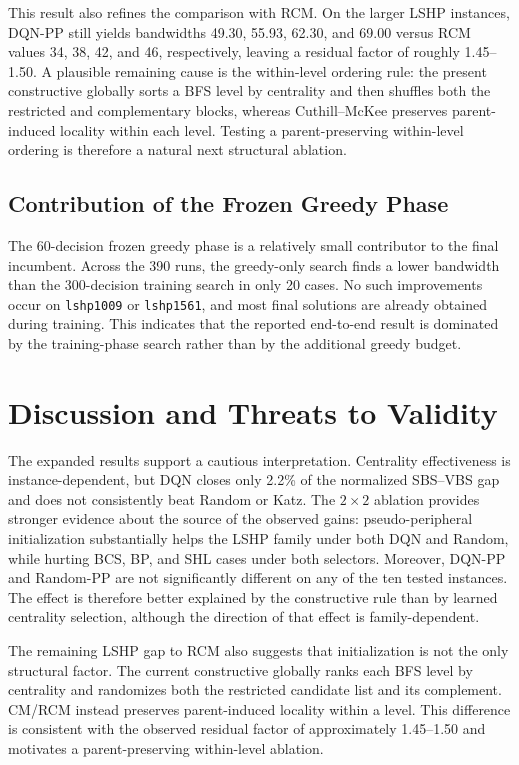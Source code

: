 \documentclass[runningheads]{llncs}
\begin{document}
This result also refines the comparison with RCM. On the larger LSHP instances, DQN-PP still yields bandwidths 49.30, 55.93, 62.30, and 69.00 versus RCM values 34, 38, 42, and 46, respectively, leaving a residual factor of roughly 1.45--1.50. A plausible remaining cause is the within-level ordering rule: the present constructive globally sorts a BFS level by centrality and then shuffles both the restricted and complementary blocks, whereas Cuthill--McKee preserves parent-induced locality within each level. Testing a parent-preserving within-level ordering is therefore a natural next structural ablation.


\subsection{Contribution of the Frozen Greedy Phase}

The 60-decision frozen greedy phase is a relatively small contributor to the final incumbent. Across the 390 runs, the greedy-only search finds a lower bandwidth than the 300-decision training search in only 20 cases. No such improvements occur on \texttt{lshp1009} or \texttt{lshp1561}, and most final solutions are already obtained during training. This indicates that the reported end-to-end result is dominated by the training-phase search rather than by the additional greedy budget.


\section{Discussion and Threats to Validity}

The expanded results support a cautious interpretation. Centrality effectiveness is instance-dependent, but DQN closes only 2.2\% of the normalized SBS--VBS gap and does not consistently beat Random or Katz. The $2\times2$ ablation provides stronger evidence about the source of the observed gains: pseudo-peripheral initialization substantially helps the LSHP family under both DQN and Random, while hurting BCS, BP, and SHL cases under both selectors. Moreover, DQN-PP and Random-PP are not significantly different on any of the ten tested instances. The effect is therefore better explained by the constructive rule than by learned centrality selection, although the direction of that effect is family-dependent.

The remaining LSHP gap to RCM also suggests that initialization is not the only structural factor. The current constructive globally ranks each BFS level by centrality and randomizes both the restricted candidate list and its complement. CM/RCM instead preserves parent-induced locality within a level. This difference is consistent with the observed residual factor of approximately 1.45--1.50 and motivates a parent-preserving within-level ablation.
\end{document}
